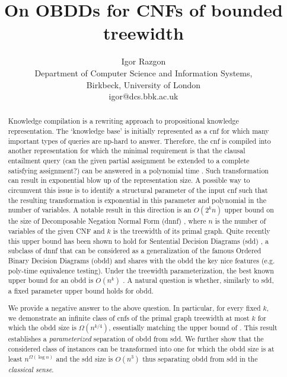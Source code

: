 \documentclass{article}
\date{}
\title{On OBDDs for CNFs of bounded treewidth}
\author{Igor Razgon\\ Department of Computer Science and Information Systems,\\ Birkbeck, University of London\\
        igor@dcs.bbk.ac.uk}
\begin{document}
\maketitle
\begin{abstract}
Knowledge compilation is a rewriting approach to propositional knowledge representation.
The `knowledge base' is initially represented as a {\sc cnf} for which many important types of
queries are {\sc np}-hard to answer. Therefore, the {\sc cnf} is compiled into another
representation for which the minimal requirement is that the clausal entailment query
(can the given partial assignment be extended to a complete satisfying assignment?)
can be answered in a polynomial time \cite{DerMar}. Such transformation can result in exponential
blow up of the representation size. A possible way to circumvent this issue is to
identify a structural parameter of the input {\sc cnf} such that the resulting transformation
is exponential in this parameter and polynomial in the number of variables.
A notable result in this direction is an $O(2^kn)$ upper bound on the size of
Decomposable Negation Normal Form ({\sc dnnf}) \cite{DarwicheJACM}, where $n$ is the
number of variables of the given CNF and $k$ is the treewidth of its primal graph. Quite recently
this upper bound has been shown to hold for Sentential Decision Diagrams ({\sc sdd}) \cite{SDD}, 
a subclass of {\sc dnnf} that can be considered as a generalization of the famous Ordered Binary Decision Diagrams
({\sc obdd}) and shares with the {\sc obdd} the key nice features (e.g. poly-time equivalence testing). Under the 
treewidth parameterization, the best known upper bound for an {\sc obdd} is $O(n^k)$ \cite{VardiTWD}. 
A natural question is whether, similarly to {\sc sdd}, a fixed parameter upper bound holds for {\sc obdd}.

We provide a negative answer to the above question. In particular, for every fixed $k$, 
we demonstrate an infinite class of {\sc cnf}s of the primal graph treewidth at most $k$ for which the 
{\sc obdd} size is $\Omega(n^{k/4})$, essentially matching the upper bound of \cite{VardiTWD}.
This result establishes a \emph{parameterized} separation of {\sc obdd} from {\sc sdd}. We further show that
the considered class of instances can be transformed into one for which the {\sc obdd} size is at least $n^{\Omega(\log n)}$
and the {\sc sdd} size is $O(n^3)$ thus separating {\sc obdd} from {\sc sdd} in the \emph{classical sense}. 



\end{abstract}
\end{document}
